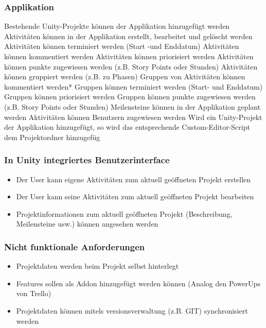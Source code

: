 \subsubsection{Applikation}
\begin{outline}
    \1 Bestehende Unity-Projekte können der Applikation hinzugefügt werden
    \1 Aktivitäten können in der Applikation erstellt, bearbeitet und gelöscht werden
    \1 Aktivitäten können terminiert werden (Start -und Enddatum)
    \1 Aktivitäten können kommentiert werden
    \1 Aktivitäten können priorisiert werden
    \1 Aktivitäten können punkte zugewiesen werden (z.B. Story Points oder Stunden)
    \1 Aktivitäten können gruppiert werden (z.B. zu Phasen)
    \1 Gruppen von Aktivitäten können kommentiert werden*
    \1 Gruppen können terminiert werden (Start- und Enddatum)
    \1 Gruppen können priorisiert werden
    \1 Gruppen können punkte zugewiesen werden (z.B. Story Points oder Stunden)
    \1 Meilensteine können in der Applikation geplant werden
    \1 Aktivitäten können Benutzern zugewiesen werden
    \1 Wird ein Unity-Projekt der Applikation hinzugefügt, so wird das entsprechende Custom-Editor-Script dem Projektordner hinzugefüg
\end{outline}
\subsubsection{In Unity integriertes Benutzerinterface}
\begin{itemize}
    \item Der User kann eigene Aktivitäten zum aktuell geöffneten Projekt erstellen
    \item Der User kann seine Aktivitäten zum aktuell geöffneten Projekt bearbeiten
    \item Projektinformationen zum aktuell geöffneten Projekt (Beschreibung, Meilensteine usw.) können angesehen werden
\end{itemize}
\subsubsection{Nicht funktionale Anforderungen}
\begin{itemize}
    \item Projektdaten werden beim Projekt selbst hinterlegt
    \item Features sollen als Addon hinzugefügt werden können (Analog den PowerUps von Trello)
    \item Projektdaten können mitels versionsverwaltung (z.B. GIT) synchronisiert werden
\end{itemize}
\newpage
